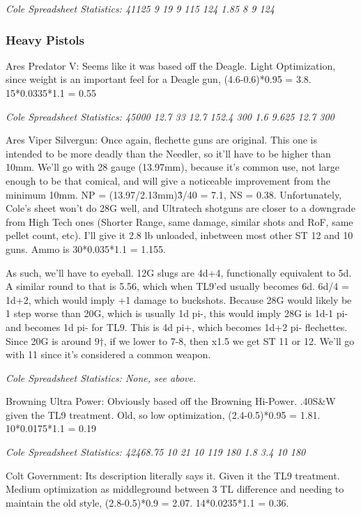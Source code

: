 \begin{multicols*}{2}
	\textit{\textcolor{OliveGreen}{Cole Spreadsheet Statistics: 41125 9 19 9 115 124 1.85 8 9 124}}
	
	\subsubsection{Heavy Pistols}
	
	Ares Predator V: Seems like it was based off the Deagle. Light Optimization, since weight is an important feel for a Deagle gun, (4.6-0.6)*0.95 = 3.8. 15*0.0335*1.1 = 0.55
	
	\textit{\textcolor{OliveGreen}{Cole Spreadsheet Statistics: 45000 12.7 33 12.7 152.4 300 1.6 9.625 12.7 300}}
	
	Ares Viper Silvergun: Once again, flechette guns are original. This one is intended to be more deadly than the Needler, so it'll have to be higher than 10mm. We'll go with 28 gauge (13.97mm), because it's common use, not large enough to be that comical, and will give a noticeable improvement from the minimum 10mm. NP = (13.97/2.13mm)\^3/40 = 7.1, NS = 0.38. Unfortunately, Cole's sheet won't do 28G well, and Ultratech shotguns are closer to a downgrade from High Tech ones (Shorter Range, same damage, similar shots and RoF, same pellet count, etc). I'll give it 2.8 lb unloaded, inbetween most other ST 12 and 10 guns. Ammo is 30*0.035*1.1 = 1.155.
	
	As such, we'll have to eyeball. 12G slugs are 4d+4, functionally equivalent to 5d. A similar round to that is 5.56, which when TL9'ed usually becomes 6d. 6d/4 = 1d+2, which would imply +1 damage to buckshots. Because 28G would likely be 1 step worse than 20G, which is usually 1d pi-, this would imply 28G is 1d-1 pi- and becomes 1d pi- for TL9. This is 4d pi+, which becomes 1d+2 pi- flechettes. Since 20G is around 9†, if we lower to 7-8, then x1.5 we get ST 11 or 12. We'll go with 11 since it's considered a common weapon.
	
	\textit{\textcolor{OliveGreen}{Cole Spreadsheet Statistics: None, see above.}}
	
	Browning Ultra Power: Obviously based off the Browning Hi-Power. .40S\&W given the TL9 treatment. Old, so low optimization, (2.4-0.5)*0.95 = 1.81. 10*0.0175*1.1 = 0.19
	
	\textit{\textcolor{OliveGreen}{Cole Spreadsheet Statistics: 42468.75 10 21 10 119 180 1.8 3.4 10 180}}
	
	Colt Government: Its description literally says it. Given it the TL9 treatment. Medium optimization as middleground between 3 TL difference and needing to maintain the old style, (2.8-0.5)*0.9 = 2.07. 14*0.0235*1.1 = 0.36.
	

\end{multicols*}
